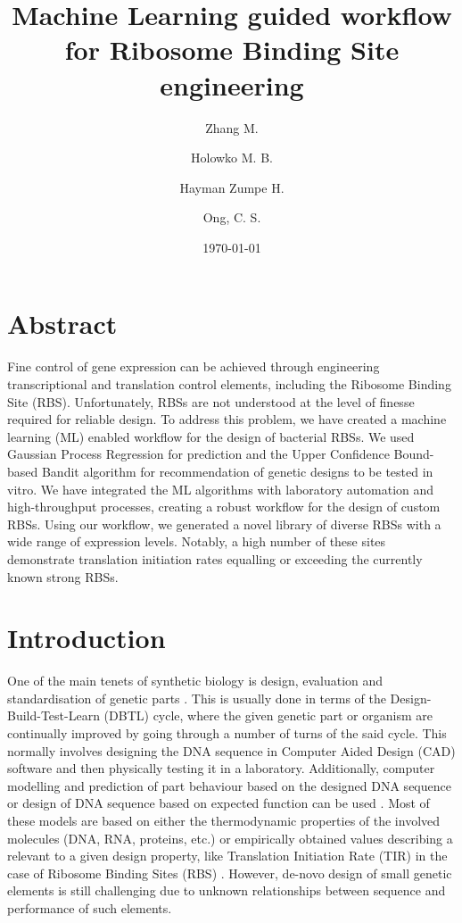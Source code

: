 \documentclass{article}
\title{Machine Learning guided workflow for Ribosome Binding Site engineering}
\author[1,2,4]{Zhang M.}
\author[3]{Holowko M. B.}
\author[3]{Hayman Zumpe H.}
\author[1,2,4]{Ong, C. S.}
\affil[1]{Machine Learning and Artificial Intelligence Future Science Platform, CSIRO}
\affil[2]{Department of Computer Science, Australian National University}
\affil[3]{CSIRO Synthetic Biology Future Science Platform, CSIRO Land and Water}
\affil[4]{Data61, CSIRO}
\date{\today{}}
\begin{document}
\maketitle

\section*{Abstract}

Fine control of gene expression can be achieved through engineering transcriptional and translation control elements, including the Ribosome Binding Site (RBS).
Unfortunately, RBSs are not understood at the level of finesse required for reliable design. 
To address this problem, we have created a machine learning (ML) enabled workflow for the design of bacterial RBSs.
We used Gaussian Process Regression for prediction and the Upper Confidence Bound-based Bandit algorithm for recommendation of genetic designs to be tested in vitro.
We have integrated the ML algorithms with laboratory automation and high-throughput processes, creating a robust workflow for the design of custom RBSs.
Using our workflow, we generated a novel library of diverse RBSs with a wide range of expression levels.
Notably, a high number of these sites demonstrate translation initiation rates equalling or exceeding the currently known strong RBSs.

\section{Introduction}

One of the main tenets of synthetic biology is design, evaluation and standardisation of genetic parts \cite{Brophy2014,Canton2008,Stanton2014}.
This is usually done in terms of the Design-Build-Test-Learn (DBTL) cycle, where the given genetic part or organism are continually improved by going through a number of turns of the said cycle.
This normally involves designing the DNA sequence in Computer Aided Design (CAD) software and then physically testing it in a laboratory. 
Additionally, computer modelling and prediction of part behaviour based on the designed DNA sequence or design of DNA sequence based on expected function can be used \cite{Yeoh2019,Nielsen2016}.
Most of these models are based on either the thermodynamic properties of the involved molecules (DNA, RNA, proteins, etc.) or empirically obtained values describing a relevant to a given design property, like Translation Initiation Rate (TIR) in the case of Ribosome Binding Sites (RBS) \cite{Xia1998,Chen2013,Reeve2014}.
However, de-novo design of small genetic elements is still challenging due to unknown relationships between sequence and performance of such elements.\\
\end{document}
